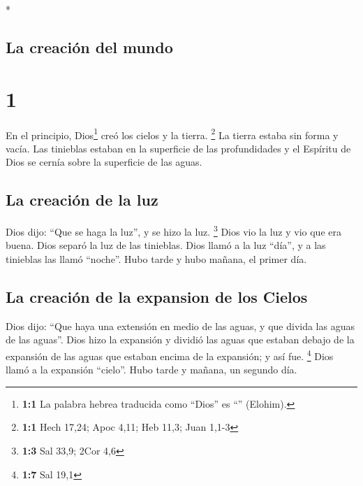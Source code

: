 \begin{paracol}{2} \switchcolumn[0]*

\hypertarget{la-creaciuxf3n-del-mundo}{%
\subsection{La creación del mundo}\label{la-creaciuxf3n-del-mundo}}

\hypertarget{section}{%
\section{1}\label{section}}

 En el principio, Dios\footnote{\textbf{1:1} La palabra
  hebrea traducida como ``Dios'' es ``'' (Elohim).} creó
los cielos y la tierra. \footnote{\textbf{1:1} Hech 17,24; Apoc 4,11;
  Heb 11,3; Juan 1,1-3}  La tierra estaba sin forma y
vacía. Las tinieblas estaban en la superficie de las profundidades y el
Espíritu de Dios se cernía sobre la superficie de las aguas.

\hypertarget{la-creaciuxf3n-de-la-luz}{%
\subsection{La creación de la luz}\label{la-creaciuxf3n-de-la-luz}}

 Dios dijo: ``Que se haga la luz'', y se hizo la luz.
\footnote{\textbf{1:3} Sal 33,9; 2Cor 4,6}  Dios vio la
luz y vio que era buena. Dios separó la luz de las tinieblas.
 Dios llamó a la luz ``día'', y a las tinieblas las llamó
``noche''. Hubo tarde y hubo mañana, el primer día.

\hypertarget{la-creaciuxf3n-de-la-expansion-de-los-cielos}{%
\subsection{La creación de la expansion de los
Cielos}\label{la-creaciuxf3n-de-la-expansion-de-los-cielos}}

 Dios dijo: ``Que haya una extensión en medio de las
aguas, y que divida las aguas de las aguas''.  Dios hizo
la expansión y dividió las aguas que estaban debajo de la expansión de
las aguas que estaban encima de la expansión; y así fue. \footnote{\textbf{1:7}
  Sal 19,1}  Dios llamó a la expansión ``cielo''. Hubo
tarde y mañana, un segundo día.


\end{paracol}
